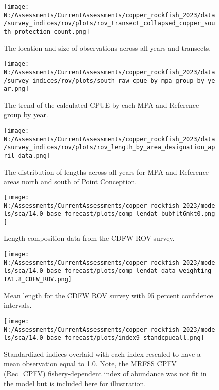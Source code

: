 \documentclass[11pt,
  english,
  letterpaper,
]{article}
\begin{document}
\pagebreak

\begin{figure}
\centering
\texttt{[image: N:/Assessments/CurrentAssessments/copper\_rockfish\_2023/data/survey\_indices/rov/plots/rov\_transect\_collapsed\_copper\_south\_protection\_count.png]}
\caption{The location and size of observations across all years and transects.\label{fig:rov-obs-loc}}
\end{figure}

\pagebreak

\begin{figure}
\centering
\texttt{[image: N:/Assessments/CurrentAssessments/copper\_rockfish\_2023/data/survey\_indices/rov/plots/south\_raw\_cpue\_by\_mpa\_group\_by\_year.png]}
\caption{The trend of the calculated CPUE by each MPA and Reference group by year.\label{fig:rov-raw-cpue}}
\end{figure}

\pagebreak

\begin{figure}
\centering
\texttt{[image: N:/Assessments/CurrentAssessments/copper\_rockfish\_2023/data/survey\_indices/rov/plots/rov\_length\_by\_area\_designation\_april\_data.png]}
\caption{The distribution of lengths across all years for MPA and Reference areas north and south of Point Conception.\label{fig:rov-len}}
\end{figure}

\pagebreak

\begin{figure}
\centering
\texttt{[image: N:/Assessments/CurrentAssessments/copper\_rockfish\_2023/models/sca/14.0\_base\_forecast/plots/comp\_lendat\_bubflt6mkt0.png]}
\caption{Length composition data from the CDFW ROV survey.\label{fig:rov-len-data}}
\end{figure}

\pagebreak

\begin{figure}
\centering
\texttt{[image: N:/Assessments/CurrentAssessments/copper\_rockfish\_2023/models/sca/14.0\_base\_forecast/plots/comp\_lendat\_data\_weighting\_TA1.8\_CDFW\_ROV.png]}
\caption{Mean length for the CDFW ROV survey with 95 percent confidence intervals.\label{fig:mean-rov-len-data}}
\end{figure}

\pagebreak

\begin{figure}
\centering
\texttt{[image: N:/Assessments/CurrentAssessments/copper\_rockfish\_2023/models/sca/14.0\_base\_forecast/plots/index9\_standcpueall.png]}
\caption{Standardized indices overlaid with each index rescaled to have a mean observation equal to 1.0. Note, the MRFSS CPFV (Rec\_CPFV) fishery-dependent index of abundance was not fit in the model but is included here for illustration.\label{fig:stand-cpue}}
\end{figure}
\end{document}
